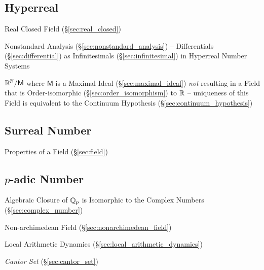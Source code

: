 \subsection{Hyperreal}\label{sec:hyperreal}

Real Closed Field (\S\ref{sec:real_closed})

\fist Nonstandard Analysis (\S\ref{sec:nonstandard_analysis}) -- Differentials
  (\S\ref{sec:differential}) as Infinitesimals (\S\ref{sec:infinitesimal}) in
  Hyperreal Number Systems

$\mathbb{R}^{\mathbb{N}} / \mathsf{M}$ where $\mathsf{M}$ is a Maximal Ideal
(\S\ref{sec:maximal_ideal}) \emph{not} resulting in a Field that is
Order-isomorphic (\S\ref{sec:order_isomorphism}) to $\mathbb{R}$ --
uniqueness of this Field is equivalent to the Continuum Hypothesis
(\S\ref{sec:continuum_hypothesis})



\subsection{Surreal Number}\label{sec:surreal_number}

Properties of a Field (\S\ref{sec:field})



\subsection{$p$-adic Number}\label{sec:padic_number}

Algebraic Closure of $\mathbb{Q}_p$ is Isomorphic to the Complex Numbers
(\S\ref{sec:complex_number})

Non-archimedean Field (\S\ref{sec:nonarchimedean_field})

Local Arithmetic Dynamics (\S\ref{sec:local_arithmetic_dynamics})

\emph{Cantor Set} (\S\ref{sec:cantor_set})



